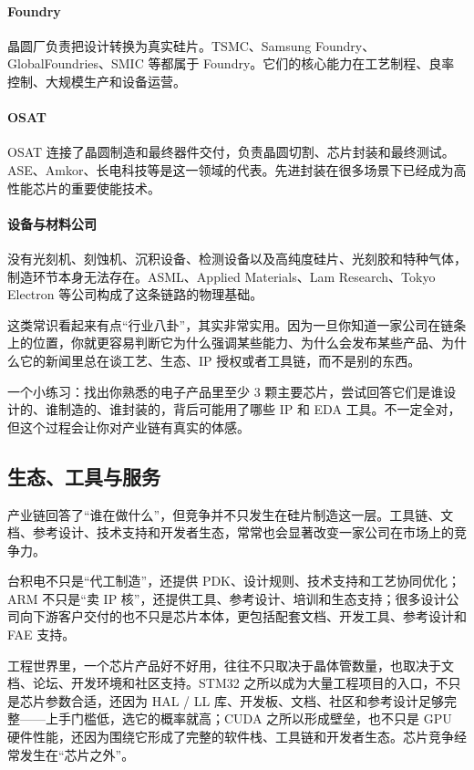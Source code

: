 \documentclass[11pt,a4paper]{article}
\begin{document}
\paragraph{Foundry}
晶圆厂负责把设计转换为真实硅片。TSMC、Samsung Foundry、GlobalFoundries、SMIC 等都属于 Foundry。它们的核心能力在工艺制程、良率控制、大规模生产和设备运营。

\paragraph{OSAT}
OSAT 连接了晶圆制造和最终器件交付，负责晶圆切割、芯片封装和最终测试。ASE、Amkor、长电科技等是这一领域的代表。先进封装在很多场景下已经成为高性能芯片的重要使能技术。

\paragraph{设备与材料公司}
没有光刻机、刻蚀机、沉积设备、检测设备以及高纯度硅片、光刻胶和特种气体，制造环节本身无法存在。ASML、Applied Materials、Lam Research、Tokyo Electron 等公司构成了这条链路的物理基础。

这类常识看起来有点``行业八卦''，其实非常实用。因为一旦你知道一家公司在链条上的位置，你就更容易判断它为什么强调某些能力、为什么会发布某些产品、为什么它的新闻里总在谈工艺、生态、IP 授权或者工具链，而不是别的东西。

\begin{tipbox}
一个小练习：找出你熟悉的电子产品里至少 3 颗主要芯片，尝试回答它们是谁设计的、谁制造的、谁封装的，背后可能用了哪些 IP 和 EDA 工具。不一定全对，但这个过程会让你对产业链有真实的体感。
\end{tipbox}

\subsection{生态、工具与服务}

产业链回答了``谁在做什么''，但竞争并不只发生在硅片制造这一层。工具链、文档、参考设计、技术支持和开发者生态，常常也会显著改变一家公司在市场上的竞争力。

台积电不只是``代工制造''，还提供 PDK、设计规则、技术支持和工艺协同优化；ARM 不只是``卖 IP 核''，还提供工具、参考设计、培训和生态支持；很多设计公司向下游客户交付的也不只是芯片本体，更包括配套文档、开发工具、参考设计和 FAE 支持。

工程世界里，一个芯片产品好不好用，往往不只取决于晶体管数量，也取决于文档、论坛、开发环境和社区支持。STM32 之所以成为大量工程项目的入口，不只是芯片参数合适，还因为 HAL / LL 库、开发板、文档、社区和参考设计足够完整——上手门槛低，选它的概率就高；CUDA 之所以形成壁垒，也不只是 GPU 硬件性能，还因为围绕它形成了完整的软件栈、工具链和开发者生态。芯片竞争经常发生在``芯片之外''。
\end{document}
